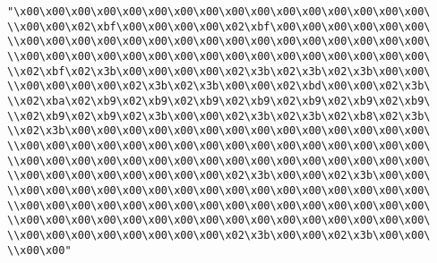\verb|"\x00\x00\x00\x00\x00\x00\x00\x00\x00\x00\x00\x00\x00\x00\x00\x00\|\newline
\verb|\\x00\x00\x02\xbf\x00\x00\x00\x00\x02\xbf\x00\x00\x00\x00\x00\x00\|\newline
\verb|\\x00\x00\x00\x00\x00\x00\x00\x00\x00\x00\x00\x00\x00\x00\x00\x00\|\newline
\verb|\\x00\x00\x00\x00\x00\x00\x00\x00\x00\x00\x00\x00\x00\x00\x00\x00\|\newline
\verb|\\x02\xbf\x02\x3b\x00\x00\x00\x00\x02\x3b\x02\x3b\x02\x3b\x00\x00\|\newline
\verb|\\x00\x00\x00\x00\x02\x3b\x02\x3b\x00\x00\x02\xbd\x00\x00\x02\x3b\|\newline
\verb|\\x02\xba\x02\xb9\x02\xb9\x02\xb9\x02\xb9\x02\xb9\x02\xb9\x02\xb9\|\newline
\verb|\\x02\xb9\x02\xb9\x02\x3b\x00\x00\x02\x3b\x02\x3b\x02\xb8\x02\x3b\|\newline
\verb|\\x02\x3b\x00\x00\x00\x00\x00\x00\x00\x00\x00\x00\x00\x00\x00\x00\|\newline
\verb|\\x00\x00\x00\x00\x00\x00\x00\x00\x00\x00\x00\x00\x00\x00\x00\x00\|\newline
\verb|\\x00\x00\x00\x00\x00\x00\x00\x00\x00\x00\x00\x00\x00\x00\x00\x00\|\newline
\verb|\\x00\x00\x00\x00\x00\x00\x00\x00\x02\x3b\x00\x00\x02\x3b\x00\x00\|\newline
\verb|\\x00\x00\x00\x00\x00\x00\x00\x00\x00\x00\x00\x00\x00\x00\x00\x00\|\newline
\verb|\\x00\x00\x00\x00\x00\x00\x00\x00\x00\x00\x00\x00\x00\x00\x00\x00\|\newline
\verb|\\x00\x00\x00\x00\x00\x00\x00\x00\x00\x00\x00\x00\x00\x00\x00\x00\|\newline
\verb|\\x00\x00\x00\x00\x00\x00\x00\x00\x02\x3b\x00\x00\x02\x3b\x00\x00\|\newline
\verb|\\x00\x00"|\newline
